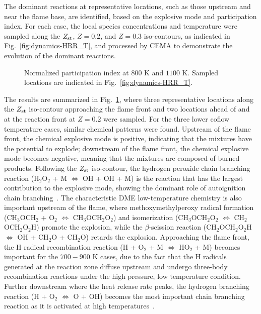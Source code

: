 The dominant reactions at representative locations, such as those upstream and near the flame base, are identified, based on the explosive mode and participation index.  For each case, the local species concentrations and temperature were sampled along the $Z_{\rm st}$, $Z = 0.2$, and $Z = 0.3$ iso-contours, as indicated in Fig.~\ref{fig:dynamics-HRR_T}, and processed by CEMA to demonstrate the evolution of the dominant reactions.

\begin{figure}
  \centering
  \scriptsize
  
  
  \normalsize
  \caption{Normalized participation index at $800$ K and $1100$ K.  Sampled locations are indicated in Fig.~\ref{fig:dynamics-HRR_T}.}
  \label{fig:CEMA_T}
\end{figure}

The results are summarized in Fig.~\ref{fig:CEMA_T}, where three representative locations along the $Z_{\rm st}$ iso-contour approaching the flame front and two locations ahead of and at the reaction front at $Z = 0.2$ were sampled.  For the three lower coflow temperature cases, similar chemical patterns were found.  Upstream of the flame front, the chemical explosive mode is positive, indicating that the mixtures have the potential to explode; downstream of the flame front, the chemical explosive mode becomes negative, meaning that the mixtures are composed of burned products.  Following the $Z_{\rm st}$ iso-contour, the hydrogen peroxide chain branching reaction (H$_2$O$_2$ + M $\Longleftrightarrow$ OH + OH + M) is the reaction that has the largest contribution to the explosive mode, showing the dominant role of autoignition chain branching~\cite{westbrook00}.  The characteristic DME low-temperature chemistry is also important upstream of the flame, where methoxymethylperoxy radical formation (CH$_3$OCH$_2$ + O$_2$ $\Longleftrightarrow$ CH$_3$OCH$_2$O$_2$) and isomerization (CH$_3$OCH$_2$O$_2$ $\Longleftrightarrow$ CH$_2$OCH$_2$O$_2$H) promote the explosion, while the $\beta$-scission reaction (CH$_2$OCH$_2$O$_2$H $\Longleftrightarrow$ OH + CH$_2$O + CH$_2$O) retards the explosion.  Approaching the flame front, the H radical recombination reaction (H + O$_2$ + M $\Longleftrightarrow$ HO$_2$ + M) becomes important for the $700-900$ K cases, due to the fact that the H radicals generated at the reaction zone diffuse upstream and undergo three-body recombination reactions under the high pressure, low temperature condition.  Further downstream where the heat release rate peaks, the hydrogen branching reaction (H + O$_2$ $\Longleftrightarrow$ O + OH) becomes the most important chain branching reaction as it is activated at high temperatures~\cite{westbrook00}.

